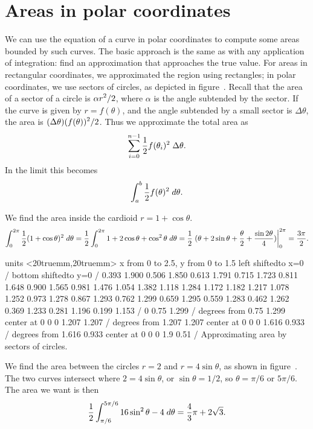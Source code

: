 \section{Areas in polar coordinates}{}{}
\nobreak
We can use the equation of a curve in polar coordinates to compute
some areas bounded by such curves.
The basic approach is the same as with any application of integration:
find an approximation that approaches the true value. For areas in
rectangular coordinates, we approximated the region using rectangles;
in polar coordinates, we use sectors of circles, as depicted in
figure~. Recall that the
area of a sector of a circle is $\displaystyle \alpha r^2/2$, where $\alpha$ is the
angle subtended by the sector. If the curve is given by $r=f(\theta)$,
and the angle subtended by a small sector is $\Delta\theta$, 
the area is $\displaystyle (\Delta\theta)(f(\theta))^2/2$.
Thus we approximate the total area as
$$\sum_{i=0}^{n-1} {1\over 2} f(\theta_i)^2\;\Delta\theta.$$
In the limit this becomes
$$\int_a^b {1\over 2} f(\theta)^2\;d\theta.$$

\example
We find the area inside the cardioid $r=1+\cos\theta$.
$$\int_0^{2\pi}{1\over 2} (1+\cos\theta)^2\;d\theta=
{1\over 2}\int_0^{2\pi} 1+2\cos\theta+\cos^2\theta\;d\theta=
{1\over 2}\left.(\theta +2\sin\theta+
{\theta\over2}+{\sin2\theta\over4})\right|_0^{2\pi}={3\pi\over2}.$$
\endexample

\figure
\texonly
\vbox{\beginpicture
\normalgraphs
\ninepoint
\setcoordinatesystem units <20truemm,20truemm>
\setplotarea x from 0 to 2.5, y from 0  to 1.5
\axis left shiftedto x=0 /
\axis bottom shiftedto y=0 /
\setquadratic
{} 0.393 1.900 0.506 1.850 0.613 1.791 0.715 1.723 0.811
1.648 0.900 1.565 0.981 1.476 1.054 1.382 1.118 1.284 1.172
1.182 1.217 1.078 1.252 0.973 1.278 0.867 1.293 0.762 1.299
0.659 1.295 0.559 1.283 0.462 1.262 0.369 1.233 0.281 1.196
0.199 1.153 /
\setlinear
{} 0 0.75 1.299 /
 degrees from 0.75 1.299 center at 0 0 
 0 1.207 1.207 /
 degrees from 1.207 1.207 center at 0 0
 0 1.616 0.933 / 
 degrees from 1.616 0.933 center at 0 0
 0 1.9 0.51 /
\endpicture}
\endtexonly
{}
\begincaption
Approximating area by sectors of circles.
\endcaption
\endfigure

\example We find the area between the circles $r=2$ and
$r=4\sin\theta$, as shown in figure~.
The two curves intersect where $2=4\sin\theta$, or $\sin\theta=1/2$,
so $\theta=\pi/6$ or $5\pi/6$. The area we want is then
$$
  {1\over2}\int_{\pi/6}^{5\pi/6}
  16\sin^2\theta-4\;d\theta={4\over3}\pi + 2\sqrt{3}.
$$
\endexample

